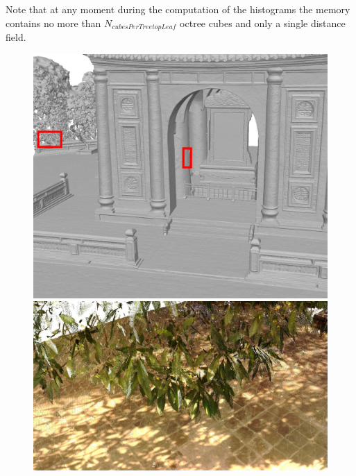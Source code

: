 \documentclass[10pt,twocolumn,letterpaper]{article}
\begin{document}
Note that at any moment during the computation of the histograms the memory contains no more than $N_{cubesPerTreetopLeaf}$ octree cubes and only
a single distance field.

\begin{figure}
    \centering
    \capstart
    \begin{minipage}[b]{0.68\linewidth}
        \includegraphics[width=\textwidth]{images/figures/results/tomb_lidar/mesh_with_highlights_min.jpg}
    \end{minipage}
    \begin{minipage}[b]{0.30\linewidth}
        \begin{minipage}[b]{\linewidth}
            \includegraphics[width=\textwidth]{images/figures/results/tomb_lidar/leaves_cloud_min.jpg}
        \end{minipage}

\end{minipage}
\end{figure}
\end{document}
